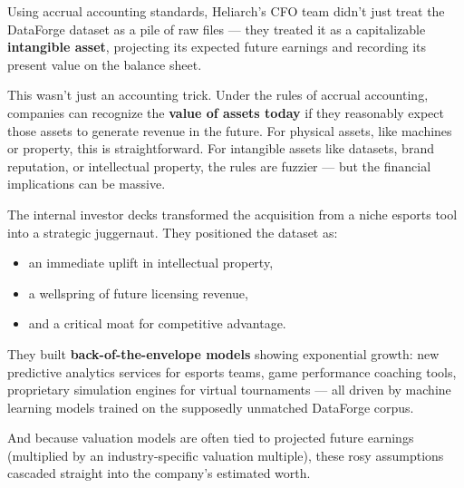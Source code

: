 Using accrual accounting standards, Heliarch’s CFO team didn’t just treat the DataForge dataset as a pile of raw files — they treated it as a capitalizable \textbf{intangible asset}, projecting its expected future earnings and recording its present value on the balance sheet.

This wasn’t just an accounting trick. Under the rules of accrual accounting, companies can recognize the \textbf{value of assets today} if they reasonably expect those assets to generate revenue in the future. For physical assets, like machines or property, this is straightforward. For intangible assets like datasets, brand reputation, or intellectual property, the rules are fuzzier — but the financial implications can be massive.

The internal investor decks transformed the acquisition from a niche esports tool into a strategic juggernaut. They positioned the dataset as:
\begin{itemize}
    \item an immediate uplift in intellectual property,
    \item a wellspring of future licensing revenue,
    \item and a critical moat for competitive advantage.
\end{itemize}

They built \textbf{back-of-the-envelope models} showing exponential growth: new predictive analytics services for esports teams, game performance coaching tools, proprietary simulation engines for virtual tournaments — all driven by machine learning models trained on the supposedly unmatched DataForge corpus.

And because valuation models are often tied to projected future earnings (multiplied by an industry-specific valuation multiple), these rosy assumptions cascaded straight into the company’s estimated worth.

